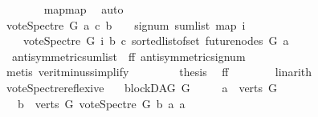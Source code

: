 \begin{isabellebody}
\ \ \ \ \ \ \isamarkupfalse%
\ map{\isacharunderscore}{\kern0pt}map\ \isamarkupfalse%
\ auto\ \ \ \ \ \ \ \isanewline
\ \ \ \ \isamarkupfalse%
\ \isamarkupfalse%
\ {\isachardoublequoteopen}vote{\isacharunderscore}{\kern0pt}Spectre\ G\ a\ c\ b\ {\isacharequal}{\kern0pt}\ {\isacharminus}{\kern0pt}\ {\isacharparenleft}{\kern0pt}\ signum\ {\isacharparenleft}{\kern0pt}sum{\isacharunderscore}{\kern0pt}list\ {\isacharparenleft}{\kern0pt}map\ {\isacharparenleft}{\kern0pt}{\isasymlambda}i{\isachardot}{\kern0pt}\isanewline
\ \ \ \ {\isacharparenleft}{\kern0pt}vote{\isacharunderscore}{\kern0pt}Spectre\ G\ i\ b\ c{\isacharparenright}{\kern0pt}{\isacharparenright}{\kern0pt}\ {\isacharparenleft}{\kern0pt}sorted{\isacharunderscore}{\kern0pt}list{\isacharunderscore}{\kern0pt}of{\isacharunderscore}{\kern0pt}set\ {\isacharparenleft}{\kern0pt}future{\isacharunderscore}{\kern0pt}nodes\ G\ a{\isacharparenright}{\kern0pt}{\isacharparenright}{\kern0pt}{\isacharparenright}{\kern0pt}{\isacharparenright}{\kern0pt}{\isacharparenright}{\kern0pt}{\isachardoublequoteclose}\ \isanewline
\ \ \ \ \ \ \isamarkupfalse%
\ \ antisymmetric{\isacharunderscore}{\kern0pt}sumlist\ {}\ ff{}\ antisymmetric{\isacharunderscore}{\kern0pt}signum\ \isanewline
\ \ \ \ \ \ \isamarkupfalse%
\ {\isacharparenleft}{\kern0pt}metis\ verit{\isacharunderscore}{\kern0pt}minus{\isacharunderscore}{\kern0pt}simplify{\isacharparenleft}{\kern0pt}{}{\isacharparenright}{\kern0pt}{\isacharparenright}{\kern0pt}\ \isanewline
\ \ \ \ \isamarkupfalse%
\ \isamarkupfalse%
\ {\isacharquery}{\kern0pt}thesis\ \isamarkupfalse%
\ ff\isanewline
\ \ \ \ \ \ \isamarkupfalse%
\ linarith\ \isanewline
\ \ \isamarkupfalse%
\ \ \isanewline
{}\isamarkupfalse%
%
\endisatagproof
{\isafoldproof}%
%
\isadelimproof
\isanewline
%
\endisadelimproof
\isanewline
\isanewline
{}\isamarkupfalse%
\ vote{\isacharunderscore}{\kern0pt}Spectre{\isacharunderscore}{\kern0pt}reflexive{\isacharcolon}{\kern0pt}\isanewline
\ \ \ {\isachardoublequoteopen}blockDAG\ G{\isachardoublequoteclose}\isanewline
\ \ \ \ \ {\isachardoublequoteopen}a\ {\isasymin}\ verts\ G{\isachardoublequoteclose}\isanewline
\ \ \ {\isachardoublequoteopen}{\isasymforall}b\ {\isasymin}\ verts\ G{\isachardot}{\kern0pt}\ vote{\isacharunderscore}{\kern0pt}Spectre\ G\ b\ a\ a\ {\isacharequal}{\kern0pt}\ {}\ {\isachardoublequoteclose}%

\end{isabellebody}
